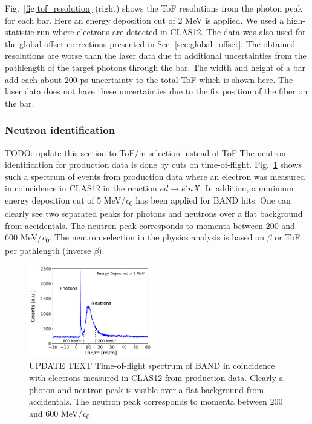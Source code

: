 \documentclass[3p,final,twocolumn]{elsarticle}
\begin{document}
Fig.~\ref{fig:tof_resolution} (right) shows the ToF resolutions from the photon peak for each bar. Here an energy deposition cut of 2 \si{\mega\electronvolt} is applied. We used a high-statistic run where electrons are detected in CLAS12. The data was also used for the global offset corrections presented in Sec. \ref{sec:global_offset}. 
The obtained resolutions are worse than the laser data due to additional uncertainties from the pathlength of the target photons through the bar. The width and height of a bar add each about 200 \si{\pico\s} uncertainty to the total ToF which is shown here. The laser data does not have these uncertainties due to the fix position of the fiber on the bar.


\subsubsection{Neutron identification}
\label{sec:neutronidentification}
{\color{red}  TODO: update this section to ToF/m selection instead of ToF}
The neutron identification for production data is done by cuts on time-of-flight. Fig.~\ref{fig:tof} shows such a spectrum of events from production data where an electron was measured in coincidence in CLAS12 in the reaction $ed \rightarrow e'nX$. In addition, a minimum energy deposition cut of 5 \si{\MeV/\clight} has been applied for BAND hits. One can clearly see two separated peaks for photons and neutrons over a flat background from accidentals. The neutron peak corresponds to momenta between $200$ and $600$ \si{\MeV/\clight}.
The neutron selection in the physics analysis is based on $\beta$ or ToF per pathlength (inverse $\beta$).

\begin{figure}[tb]
	\centering
		\includegraphics[width=0.48\textwidth]{tofm-performance.pdf}
	\caption{UPDATE TEXT Time-of-flight spectrum of BAND in coincidence with electrons measured in CLAS12 from production data. Clearly a photon and neutron peak is visible over a flat background from accidentals. The neutron peak corresponds to momenta  between $200$ and $600$ \si{\MeV/\clight}}
	\label{fig:tof}
\end{figure}
\end{document}
